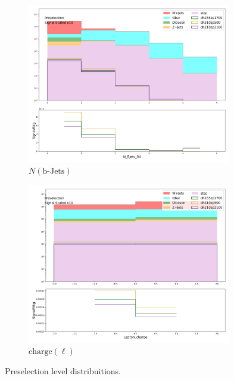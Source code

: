 \begin{figure}[htbp]
\begin{subfigure}{0.49\textwidth}
         \includegraphics[width = 0.98\textwidth]{Figures/appendix/Preselection/N_BJets_04.png}
         \caption{\ensuremath{N (\text{b-Jets})}\xspace}
         \end{subfigure}
         \begin{subfigure}{0.49\textwidth}
         \includegraphics[width = 0.98\textwidth]{Figures/appendix/Preselection/Lepton_charge.png}
         \caption{$\text{charge}(\ell)$}
         \end{subfigure}

         \caption{Preselection level distribuitions.}
         \label{fig:Presel3}
      \end{figure}
